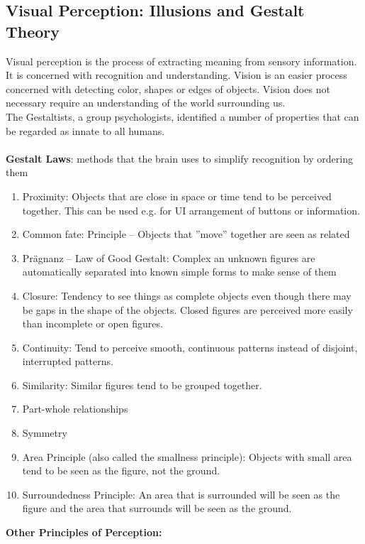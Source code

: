 \subsection{Visual Perception: Illusions and Gestalt Theory}
Visual perception is the process of extracting meaning from sensory information. It is concerned with recognition and understanding.
Vision is an easier process concerned with detecting color, shapes or edges of objects. Vision does not necessary require an understanding of the world surrounding us.\\
The Gestaltists, a group psychologists, identified a number of properties that can be regarded as innate to all humans. \\\\
\textbf{Gestalt Laws}: methods that the brain uses to simplify recognition by ordering them
\begin{enumerate}
\item Proximity: Objects that are close in space or time tend to be perceived together. This can be used e.g. for UI arrangement of buttons or information.
\item Common fate: Principle – Objects that ''move” together are seen as related
\item Prägnanz -- Law of Good Gestalt: Complex an unknown figures are automatically separated into known simple forms to make sense of them
\item Closure: Tendency to see things as complete objects even though there may be gaps in the shape of the objects. Closed figures are perceived more easily than incomplete or open figures.
\item Continuity: Tend to perceive smooth, continuous patterns instead of disjoint, interrupted patterns.
\item Similarity: Similar figures tend to be grouped together.
\item Part-whole relationships
\item Symmetry
\item Area Principle (also called the smallness principle): Objects with small area tend to be seen as the figure, not the ground.
\item Surroundedness Principle: An area that is surrounded will be seen as the figure and the area that surrounds will be seen as the ground.
\end{enumerate}
\textbf{Other Principles of Perception:}
